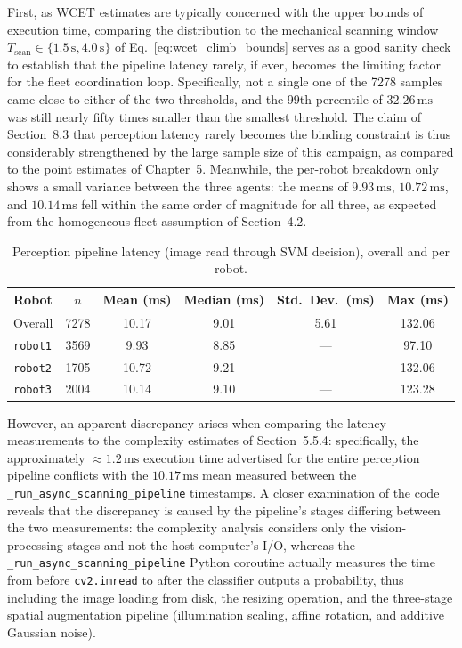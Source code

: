 First, as WCET estimates are typically concerned with the upper bounds of execution time, comparing the distribution to the mechanical scanning window $T_{\text{scan}} \in \{1.5\,\text{s}, 4.0\,\text{s}\}$ of Eq.~\eqref{eq:wcet_climb_bounds} serves as a good sanity check to establish that the pipeline latency rarely, if ever, becomes the limiting factor for the fleet coordination loop. Specifically, not a single one of the 7278 samples came close to either of the two thresholds, and the 99th percentile of $32.26\,\text{ms}$ was still nearly fifty times smaller than the smallest threshold. The claim of Section~8.3 that perception latency rarely becomes the binding constraint is thus considerably strengthened by the large sample size of this campaign, as compared to the point estimates of Chapter~5. Meanwhile, the per-robot breakdown only shows a small variance between the three agents: the means of $9.93\,\text{ms}$, $10.72\,\text{ms}$, and $10.14\,\text{ms}$ fell within the same order of magnitude for all three, as expected from the homogeneous-fleet assumption of Section~4.2.

\begin{table}[htbp]
\centering
\caption{Perception pipeline latency (image read through SVM decision), overall and per robot.}
\label{tab:perception_latency}
\begin{tabular}{@{}lccccc@{}}
\toprule
\textbf{Robot} & \textbf{$n$} & \textbf{Mean (ms)} & \textbf{Median (ms)} & \textbf{Std.\ Dev.\ (ms)} & \textbf{Max (ms)} \\ \midrule
Overall & 7278 & 10.17 & 9.01 & 5.61 & 132.06 \\
\texttt{robot1} & 3569 & 9.93 & 8.85 & --- & 97.10 \\
\texttt{robot2} & 1705 & 10.72 & 9.21 & --- & 132.06 \\
\texttt{robot3} & 2004 & 10.14 & 9.10 & --- & 123.28 \\ \bottomrule
\end{tabular}
\end{table}

However, an apparent discrepancy arises when comparing the latency measurements to the complexity estimates of Section~5.5.4: specifically, the approximately $\approx 1.2\,\text{ms}$ execution time advertised for the entire perception pipeline conflicts with the $10.17\,\text{ms}$ mean measured between the \texttt{\_run\_async\_scanning\-\_pipeline} timestamps. A closer examination of the code reveals that the discrepancy is caused by the pipeline's stages differing between the two measurements: the complexity analysis considers only the vision-processing stages and not the host computer's I/O, whereas the \texttt{\_run\_async\_scanning\_pipeline} Python coroutine actually measures the time from before \texttt{cv2.imread} to after the classifier outputs a probability, thus including the image loading from disk, the resizing operation, and the three-stage spatial augmentation pipeline (illumination scaling, affine rotation, and additive Gaussian noise).

